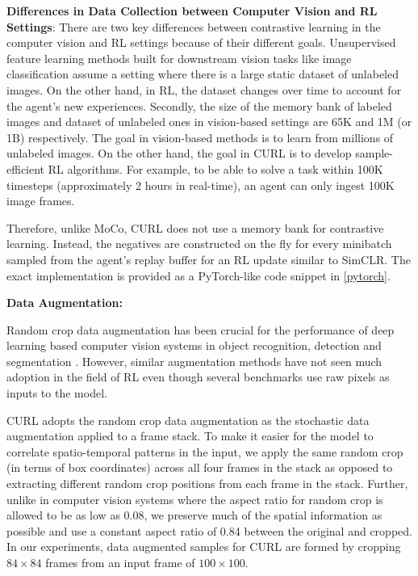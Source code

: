 {\textbf{Differences in Data Collection between Computer Vision and RL Settings}:} 
There are two key differences between contrastive learning in the computer vision and RL settings because of their different goals. Unsupervised feature learning methods built for downstream vision tasks like image classification assume a setting where there is a large static dataset of unlabeled images.  On the other hand, in RL, the dataset changes over time to account for the agent's new experiences. Secondly, the size of the memory bank of labeled images and dataset of unlabeled ones in vision-based settings are 65K and 1M (or 1B) respectively. The goal in vision-based methods is to learn from millions of unlabeled images. On the other hand, the goal in CURL is to develop sample-efficient RL algorithms. For example, to be able to solve a task within 100K timesteps (approximately 2 hours in real-time), an agent can only ingest 100K image frames.
 
 Therefore, unlike MoCo, CURL does not use a memory bank for contrastive learning. Instead, the negatives are constructed on the fly for every minibatch sampled from the agent's replay buffer for an RL update similar to SimCLR. The exact implementation is provided as a PyTorch-like code snippet in \ref{pytorch}.


{\textbf{Data Augmentation:}}  


Random crop data augmentation has been crucial for the performance of deep learning based computer vision systems in object recognition, detection and segmentation \cite{krizhevsky2012, szegedy2015, cubuk2019, chen2020simclr}. However, similar augmentation methods have not seen much adoption in the field of RL even though several benchmarks use raw pixels as inputs to the model.

CURL adopts the random crop data augmentation as the stochastic data augmentation applied to a frame stack. To make it easier for the model to correlate spatio-temporal patterns in the input, we apply the same random crop (in terms of box coordinates) across all four frames in the stack as opposed to extracting different random crop positions from each frame in the stack. Further, unlike in computer vision systems where the aspect ratio for random crop is allowed to be as low as 0.08, we preserve much of the spatial information as possible and use a constant aspect ratio of 0.84 between the original and cropped. In our experiments, data augmented samples for CURL are formed by cropping $84\times84$ frames from an input frame of $100\times100$. 

